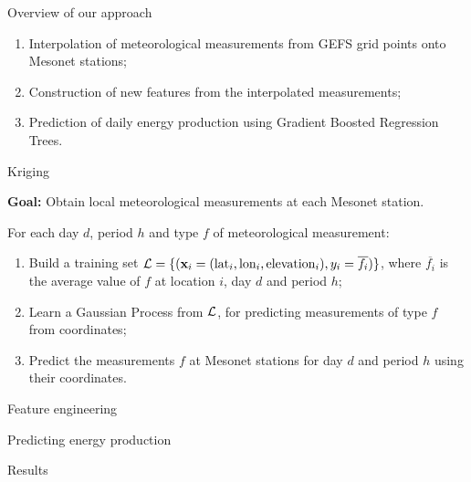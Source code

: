 \documentclass[handout]{beamer}
\begin{document}

\begin{frame}{Overview of our approach}

\begin{enumerate}
\item Interpolation of meteorological measurements from GEFS grid points onto Mesonet stations;
\item Construction of new features from the interpolated measurements;
\item Prediction of daily energy production using Gradient Boosted Regression Trees.
\end{enumerate}

\end{frame}



\begin{frame}{Kriging}

\textbf{Goal:} Obtain local meteorological measurements at each Mesonet station.

\vskip0.5cm

For each day $d$, period $h$ and type $f$ of meteorological measurement:

\begin{enumerate}

\item Build a training set ${\cal L} = \{ (\mathbf{x}_i = (\text{lat}_i,
\text{lon}_i, \text{elevation}_i), y_i = \overline{f_i} ) \}$,  where
$\overline{f_i}$ is the average value of $f$ at location $i$, day $d$ and period $h$;

\item Learn a Gaussian Process from ${\cal L}$, for predicting measurements of type $f$ from coordinates;

\item Predict the measurements $f$ at Mesonet stations for day $d$ and period $h$ using their coordinates.

\end{enumerate}

\end{frame}



\begin{frame}{Feature engineering}

\end{frame}



\begin{frame}{Predicting energy production}

\end{frame}



\begin{frame}{Results}

\end{frame}
\end{document}
